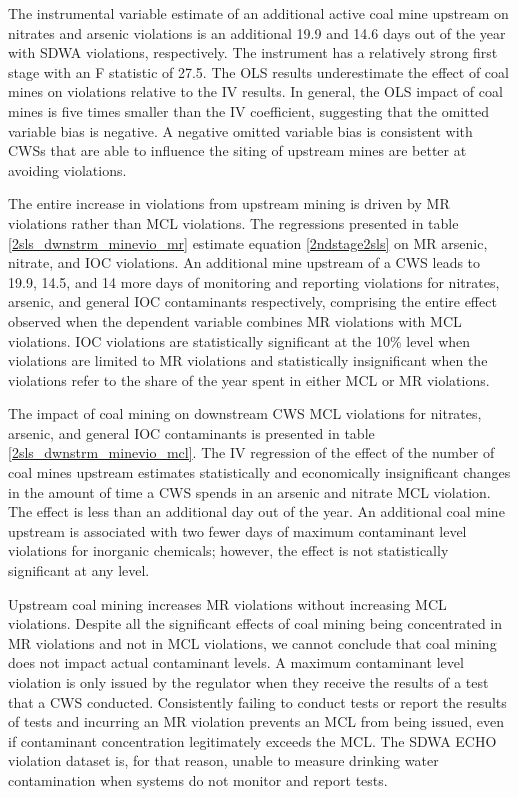 \documentclass{article}
\begin{document}
The instrumental variable estimate of an additional active coal mine upstream on nitrates and arsenic violations is an additional 19.9 and 14.6 days out of the year with SDWA violations, respectively. The instrument has a relatively strong first stage with an F statistic of 27.5. The OLS results underestimate the effect of coal mines on violations relative to the IV results. In general, the OLS impact of coal mines is five times smaller than the IV coefficient, suggesting that the omitted variable bias is negative. A negative omitted variable bias is consistent with CWSs that are able to influence the siting of upstream mines are better at avoiding violations. 

The entire increase in violations from upstream mining is driven by MR violations rather than MCL violations. The regressions presented in table \ref{2sls_dwnstrm_minevio_mr} estimate equation \ref{2ndstage2sls} on MR arsenic, nitrate, and IOC violations. An additional mine upstream of a CWS leads to 19.9, 14.5, and 14 more days of monitoring and reporting violations for nitrates, arsenic, and general IOC contaminants respectively, comprising the entire effect observed when the dependent variable combines MR violations with MCL violations. IOC violations are statistically significant at the 10\% level when violations are limited to MR violations and statistically insignificant when the violations refer to the share of the year spent in either MCL or MR violations.

The impact of coal mining on downstream CWS MCL violations for nitrates, arsenic, and general IOC contaminants is presented in table \ref{2sls_dwnstrm_minevio_mcl}. The IV regression of the effect of the number of coal mines upstream estimates statistically and economically insignificant changes in the amount of time a CWS spends in an arsenic and nitrate MCL violation. The effect is less than an additional day out of the year. An additional coal mine upstream is associated with two fewer days of maximum contaminant level violations for inorganic chemicals; however, the effect is not statistically significant at any level.

Upstream coal mining increases MR violations without increasing MCL violations. Despite all the significant effects of coal mining being concentrated in MR violations and not in MCL violations, we cannot conclude that coal mining does not impact actual contaminant levels. A maximum contaminant level violation is only issued by the regulator when they receive the results of a test that a CWS conducted. Consistently failing to conduct tests or report the results of tests and incurring an MR violation prevents an MCL from being issued, even if contaminant concentration legitimately exceeds the MCL. The SDWA ECHO violation dataset is, for that reason, unable to measure drinking water contamination when systems do not monitor and report tests.
\end{document}
